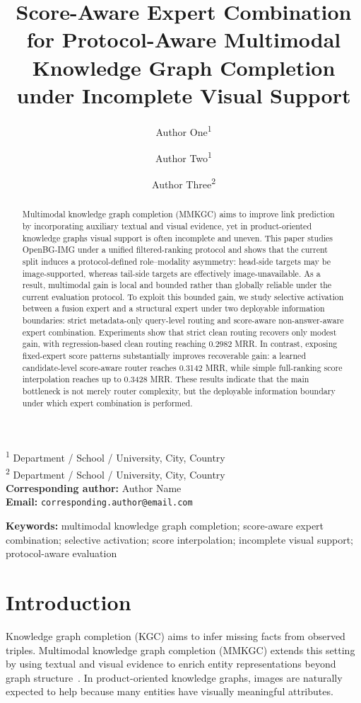 \documentclass[11pt]{article}
\title{Score-Aware Expert Combination for Protocol-Aware Multimodal Knowledge Graph Completion under Incomplete Visual Support}
\author{
Author One\textsuperscript{1} \and
Author Two\textsuperscript{1} \and
Author Three\textsuperscript{2}
}
\date{}
\begin{document}
\maketitle

\begin{center}
\textsuperscript{1} Department / School / University, City, Country \\
\textsuperscript{2} Department / School / University, City, Country \\
\vspace{0.5em}
\textbf{Corresponding author:} Author Name \\
\textbf{Email:} \texttt{corresponding.author@email.com}
\end{center}

\begin{abstract}
Multimodal knowledge graph completion (MMKGC) aims to improve link prediction by incorporating auxiliary textual and visual evidence, yet in product-oriented knowledge graphs visual support is often incomplete and uneven. This paper studies OpenBG-IMG under a unified filtered-ranking protocol and shows that the current split induces a protocol-defined role--modality asymmetry: head-side targets may be image-supported, whereas tail-side targets are effectively image-unavailable. As a result, multimodal gain is local and bounded rather than globally reliable under the current evaluation protocol. To exploit this bounded gain, we study selective activation between a fusion expert and a structural expert under two deployable information boundaries: strict metadata-only query-level routing and score-aware non-answer-aware expert combination. Experiments show that strict clean routing recovers only modest gain, with regression-based clean routing reaching 0.2982 MRR. In contrast, exposing fixed-expert score patterns substantially improves recoverable gain: a learned candidate-level score-aware router reaches 0.3142 MRR, while simple full-ranking score interpolation reaches up to 0.3428 MRR. These results indicate that the main bottleneck is not merely router complexity, but the deployable information boundary under which expert combination is performed.
\end{abstract}

\textbf{Keywords:} multimodal knowledge graph completion; score-aware expert combination; selective activation; score interpolation; incomplete visual support; protocol-aware evaluation

\section{Introduction}
Knowledge graph completion (KGC) aims to infer missing facts from observed triples. Multimodal knowledge graph completion (MMKGC) extends this setting by using textual and visual evidence to enrich entity representations beyond graph structure~\cite{trouillon2016complex,dettmers2018conve,sun2019rotate,liu2019mmkg,xie2017ikrl,mousselly2018multimodal,pezeshkpour2018mkbe}. In product-oriented knowledge graphs, images are naturally expected to help because many entities have visually meaningful attributes.
\end{document}
